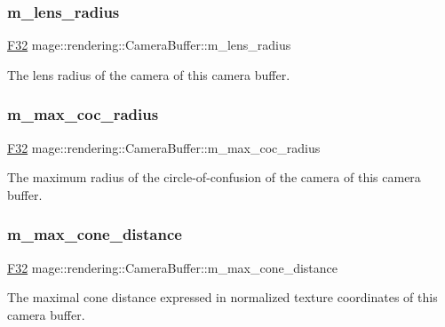\subsubsection{\texorpdfstring{m\+\_\+lens\+\_\+radius}{m\_lens\_radius}}
{\footnotesize\ttfamily \hyperlink{namespacemage_aa97e833b45f06d60a0a9c4fc22ae02c0}{F32} mage\+::rendering\+::\+Camera\+Buffer\+::m\+\_\+lens\+\_\+radius}

The lens radius of the camera of this camera buffer. \hypertarget{structmage_1_1rendering_1_1_camera_buffer_a3273510e0a7bbdd9481fe67f9e223f59}{}\label{structmage_1_1rendering_1_1_camera_buffer_a3273510e0a7bbdd9481fe67f9e223f59} 
\subsubsection{\texorpdfstring{m\+\_\+max\+\_\+coc\+\_\+radius}{m\_max\_coc\_radius}}
{\footnotesize\ttfamily \hyperlink{namespacemage_aa97e833b45f06d60a0a9c4fc22ae02c0}{F32} mage\+::rendering\+::\+Camera\+Buffer\+::m\+\_\+max\+\_\+coc\+\_\+radius}

The maximum radius of the circle-\/of-\/confusion of the camera of this camera buffer. \hypertarget{structmage_1_1rendering_1_1_camera_buffer_a99515c320feafb88a2d2fdf24520975d}{}\label{structmage_1_1rendering_1_1_camera_buffer_a99515c320feafb88a2d2fdf24520975d} 
\subsubsection{\texorpdfstring{m\+\_\+max\+\_\+cone\+\_\+distance}{m\_max\_cone\_distance}}
{\footnotesize\ttfamily \hyperlink{namespacemage_aa97e833b45f06d60a0a9c4fc22ae02c0}{F32} mage\+::rendering\+::\+Camera\+Buffer\+::m\+\_\+max\+\_\+cone\+\_\+distance}

The maximal cone distance expressed in normalized texture coordinates of this camera buffer. \hypertarget{structmage_1_1rendering_1_1_camera_buffer_a54ac25fb2de3401d4c5eb19a9f614f40}{}\label{structmage_1_1rendering_1_1_camera_buffer_a54ac25fb2de3401d4c5eb19a9f614f40} 
